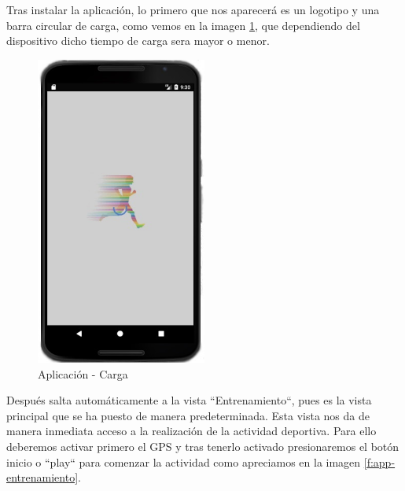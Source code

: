 \documentclass[a4paper, 11pt]{article}
\begin{document}
\begin{itemize}
      Tras instalar la aplicación, lo primero que nos aparecerá es un logotipo y una
      barra circular de carga, como vemos en la imagen  \ref{f:app-inicio}, que dependiendo
      del dispositivo dicho tiempo de carga sera mayor o menor.\\


               \begin{figure}[H]
                \centering
                \includegraphics[width=0.5\textwidth]{1inicio}
                \caption{Aplicación - Carga}
                \label{f:app-inicio}
               \end{figure}

      Después salta automáticamente a la vista ``Entrenamiento``, pues es la vista principal
      que se ha puesto de manera predeterminada. Esta vista nos da de manera inmediata acceso
      a la realización de la actividad deportiva. Para ello deberemos activar primero el GPS
      y tras tenerlo activado presionaremos el botón inicio o ``play`` para comenzar la actividad
      como apreciamos en la imagen \ref{f:app-entrenamiento}.\\


\end{itemize}
\end{document}
